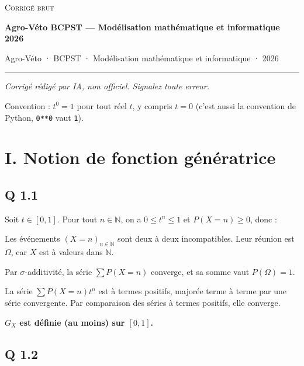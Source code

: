 \documentclass[11pt,a4paper]{article}
\newcommand{\equationajustee}[1]{%
  \sbox{\boiteequation}{$\displaystyle #1$}%
  \ifdim\wd\boiteequation>\linewidth
    \[\resizebox{\linewidth}{!}{\usebox{\boiteequation}}\]%
  \else
    \[#1\]%
  \fi}
\begin{document}
\thispagestyle{plain}
\begin{center}
  {\small\scshape Corrigé brut}\par\smallskip
  {\LARGE\bfseries Agro-Véto BCPST — Modélisation mathématique et informatique 2026\par}\medskip
  {\large Agro-Véto · BCPST · Modélisation mathématique et informatique · 2026\par}
\end{center}
\vspace{2pt}\hrule\vspace{8pt}

\emph{Corrigé rédigé par IA, non officiel. Signalez toute erreur.}

Convention : \(t^0=1\) pour tout réel \(t\), y compris \(t=0\) (c'est aussi la convention de Python, \texttt{0**0} vaut \texttt{1}).

\hypertarget{i.-notion-de-fonction-guxe9nuxe9ratrice}{%
\section{I. Notion de fonction génératrice}\label{i.-notion-de-fonction-guxe9nuxe9ratrice}}

\hypertarget{q-1.1}{%
\subsection{Q 1.1}\label{q-1.1}}

Soit \(t\in[0,1]\). Pour tout \(n\in\mathbb N\), on a \(0\le t^n\le1\) et \(P(X=n)\ge0\), donc :

\equationajustee{\begin{aligned}
0&\le P(X=n)\,t^n\\
&\le P(X=n).
\end{aligned}}

Les événements \((X=n)_{n\in\mathbb N}\) sont deux à deux incompatibles. Leur réunion est \(\Omega\), car \(X\) est à valeurs dans \(\mathbb N\).

Par \(\sigma\)-additivité, la série \(\sum P(X=n)\) converge, et sa somme vaut \(P(\Omega)=1\).

La série \(\sum P(X=n)t^n\) est à termes positifs, majorée terme à terme par une série convergente. Par comparaison des séries à termes positifs, elle converge.

\textbf{\(G_X\) est définie (au moins) sur \([0,1]\).}

\hypertarget{q-1.2}{%
\subsection{Q 1.2}\label{q-1.2}}
\end{document}
